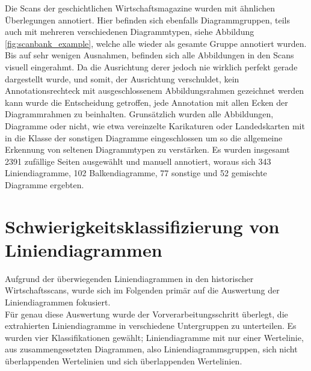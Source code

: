 Die Scans der geschichtlichen Wirtschaftsmagazine wurden mit ähnlichen Überlegungen annotiert. Hier befinden sich ebenfalls Diagrammgruppen, teils auch mit mehreren verschiedenen Diagrammtypen, siehe Abbildung \ref{fig:scanbank_example}, welche alle wieder als gesamte Gruppe annotiert wurden. Bis auf sehr wenigen Ausnahmen, befinden sich alle Abbildungen in den Scans visuell eingerahmt. Da die Ausrichtung derer jedoch nie wirklich perfekt gerade dargestellt wurde, und somit, der Ausrichtung verschuldet, kein Annotationsrechteck mit ausgeschlossenem Abbildungsrahmen gezeichnet werden kann wurde die Entscheidung getroffen, jede Annotation mit allen Ecken der Diagrammrahmen zu beinhalten. Grunsätzlich wurden alle Abbildungen, Diagramme oder nicht, wie etwa vereinzelte Karikaturen oder Landedskarten mit in die Klasse der sonstigen Diagramme eingeschlossen um so die allgemeine Erkennung von seltenen Diagrammtypen zu verstärken.
Es wurden insgesamt 2391 zufällige Seiten ausgewählt und manuell annotiert, woraus sich 343 Liniendiagramme, 102 Balkendiagramme, 77 sonstige und 52 gemischte Diagramme ergebten.

\clearpage
\section{Schwierigkeitsklassifizierung von Liniendiagrammen}

Aufgrund der überwiegenden Liniendiagrammen in den historischer Wirtschaftsscans, wurde sich im Folgenden primär auf die Auswertung der Liniendiagrammen fokusiert.
\\
Für genau diese Auswertung wurde der Vorverarbeitungsschritt überlegt, die extrahierten Liniendiagramme in verschiedene Untergruppen zu unterteilen. Es wurden vier Klassifikationen gewählt; Liniendiagramme mit nur einer Wertelinie, aus zusammengesetzten Diagrammen, also Liniendiagrammsgruppen, sich nicht überlappenden Wertelinien und sich überlappenden Wertelinien.

